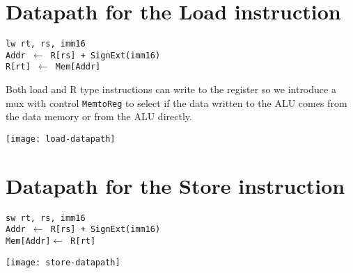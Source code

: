 \documentclass[12pt]{report}
\begin{document}
\section{Datapath for the Load instruction}
\begin{center}
\texttt{lw rt, rs, imm16\\
Addr $\longleftarrow$ R[rs] +
SignExt(imm16)\\
R[rt] $\longleftarrow$ Mem[Addr]}
\end{center}
Both load and R type instructions can write to the register so we introduce a mux with control \texttt{MemtoReg} to select if the data written to the ALU comes from the data memory or from the ALU directly.
\begin{center}
		\texttt{[image: load-datapath]}%
					\label{fig:load-datapath}%
	\end{center}
	\newpage
\section{Datapath for the Store instruction}
\begin{center}
  \texttt{sw rt, rs, imm16\\
 Addr $\longleftarrow$ R[rs] +
SignExt(imm16)\\
 Mem[Addr]$\longleftarrow$ R[rt]}
\end{center}
\begin{center}
		\texttt{[image: store-datapath]}%
					\label{fig:store-datapath}%
	\end{center}
	\newpage
\end{document}

